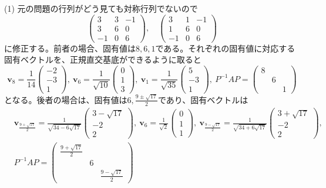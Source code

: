 \noindent (1) 元の問題の行列がどう見ても対称行列でないので
\[
\begin{pmatrix}
3 & 3 & -1 \\
3 & 6 & 0 \\
-1 & 0 & 6
\end{pmatrix}, \quad
\begin{pmatrix}
3 & 1 & -1 \\
1 & 6 & 0 \\
-1 & 0 & 6
\end{pmatrix}\]
に修正する。前者の場合、固有値は$8, 6, 1$である。それぞれの固有値に対応する固有ベクトルを、正規直交基底ができるように取ると
\[
\bm{v}_{8} = 
\frac{1}{14}
\begin{pmatrix}
-2 \\
-3 \\
1
\end{pmatrix}, \ 
\bm{v}_{6} =
\frac{1}{\sqrt{10}}
\begin{pmatrix}
0 \\
1 \\
3
\end{pmatrix}, \ 
\bm{v}_{1} =
\frac{1}{\sqrt{35}}
\begin{pmatrix}
5 \\
-3 \\
1
\end{pmatrix}, \ 
P^{-1} A P 
= 
\begin{pmatrix}
8 \\
& 6 \\
& & 1
\end{pmatrix}
\]
となる。後者の場合は、固有値は$6, \frac{9 \pm \sqrt{17}}{2}$であり、固有ベクトルは
\begin{align*}
& \bm{v}_{\frac{9 + \sqrt{17}}{2}} = 
\frac{1}{\sqrt{34 - 6\sqrt{17}}}
\begin{pmatrix}
3 - \sqrt{17} \\
-2 \\
2
\end{pmatrix}, \ 
\bm{v}_{6} =
\frac{1}{\sqrt{2}}
\begin{pmatrix}
0 \\
1 \\
1
\end{pmatrix}, \ 
\bm{v}_{\frac{9 - \sqrt{17}}{2}} =
\frac{1}{\sqrt{34 + 6\sqrt{17}}}
\begin{pmatrix}
3 + \sqrt{17} \\
-2 \\
2
\end{pmatrix}, \\
& P^{-1} A P 
= 
\begin{pmatrix}
\frac{9 + \sqrt{17}}{2} \\
& 6 \\
& & \frac{9 - \sqrt{17}}{2}
\end{pmatrix}
\end{align*}

